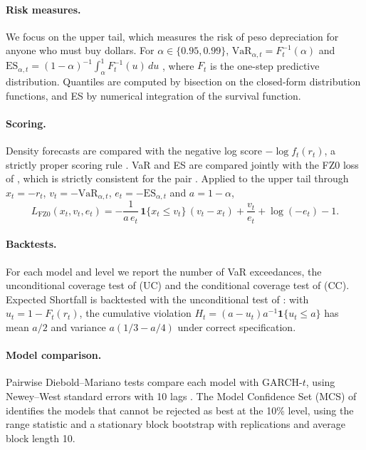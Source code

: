 \documentclass[11pt]{article}
\newcommand{\VaR}{\mathrm{VaR}}
\newcommand{\ES}{\mathrm{ES}}
\begin{document}
\paragraph{Risk measures.} We focus on the upper tail, which measures the risk of peso depreciation for anyone who must buy dollars. For $\alpha\in\{0.95,0.99\}$, $\VaR_{\alpha,t} = F_{t}^{-1}(\alpha)$ and $\ES_{\alpha,t} = (1-\alpha)^{-1}\int_\alpha^1 F_t^{-1}(u)\,du$ \citep{rockafellaruryasev2002}, where $F_t$ is the one-step predictive distribution. Quantiles are computed by bisection on the closed-form distribution functions, and ES by numerical integration of the survival function.

\paragraph{Scoring.} Density forecasts are compared with the negative log score $-\log f_t(r_t)$, a strictly proper scoring rule \citep{gneitingraftery2007}. VaR and ES are compared jointly with the FZ0 loss of \citet{pattonziegelchen2019}, which is strictly consistent for the pair \citep{fisslerziegel2016}. Applied to the upper tail through $x_t=-r_t$, $v_t=-\VaR_{\alpha,t}$, $e_t=-\ES_{\alpha,t}$ and $a=1-\alpha$,
\begin{equation}
L_{\mathrm{FZ0}}(x_t, v_t, e_t) = -\frac{1}{a\,e_t}\,\mathbf{1}\{x_t\le v_t\}\,(v_t-x_t) + \frac{v_t}{e_t} + \log(-e_t) - 1.
\end{equation}

\paragraph{Backtests.} For each model and level we report the number of VaR exceedances, the unconditional coverage test of \citet{kupiec1995} (UC) and the conditional coverage test of \citet{christoffersen1998} (CC). Expected Shortfall is backtested with the unconditional test of \citet{duescanciano2017}: with $u_t = 1-F_t(r_t)$, the cumulative violation $H_t = (a-u_t)a^{-1}\mathbf{1}\{u_t\le a\}$ has mean $a/2$ and variance $a(1/3-a/4)$ under correct specification.

\paragraph{Model comparison.} Pairwise Diebold--Mariano tests compare each model with GARCH-$t$, using Newey--West standard errors with 10 lags \citep{dieboldmariano1995,neweywest1987}. The Model Confidence Set (MCS) of \citet{hansenlundenason2011} identifies the models that cannot be rejected as best at the 10\% level, using the range statistic and a stationary block bootstrap \citep{politisromano1994} with \mcsReps{} replications and average block length 10.
\end{document}
